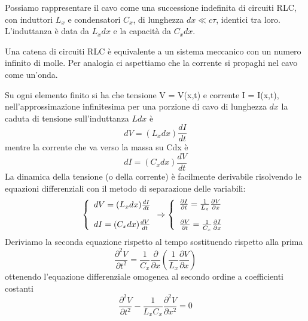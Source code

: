 Possiamo rappresentare il cavo come una successione indefinita di circuiti RLC, con induttori $L_x$ e condensatori $C_x$, di lunghezza $dx \ll c \tau$, identici tra loro. L'induttanza \`e data da $L_x dx$ e la capacit\`a da $C_xdx$.
\newline

Una catena di circuiti RLC \`e equivalente a un sistema meccanico con un numero infinito di molle. Per analogia ci aspettiamo che la corrente si propaghi nel cavo come un'onda.


Su ogni elemento finito si ha che tensione V = V(x,t) e corrente I = I(x,t), nell'approssimazione infinitesima per una porzione di cavo di lunghezza $dx$ la caduta di tensione sull'induttanza $Ldx$ \`e 
\begin{equation*}
	dV = (L_x dx) \frac{dI}{dt}
\end{equation*}
mentre la corrente che va verso la massa su Cdx \`e 
\begin{equation*}
	dI = (C_x dx) \frac{dV}{dt}
\end{equation*}
La dinamica della tensione (o della corrente) \`e facilmente derivabile risolvendo le equazioni differenziali con il metodo di separazione delle variabili:
\begin{equation}
\left\{\begin{array} { l } 
{ d V = ( L _ { x } d x ) \frac { d I } { d t } } \\ \rule{0pt}{20pt}
{ d I = ( C _ { x } d x ) \frac { d V } { d t } }
\end{array} \Rightarrow \left\{\begin{array}{l}
\frac{\partial I}{\partial t}=\frac{1}{L_x} \frac{\partial V}{\partial x} \\ \rule{0pt}{20pt}
\frac{\partial V}{\partial t}=\frac{1}{C_x} \frac{\partial I}{\partial x}
\end{array}\right.\right.
\end{equation}
Deriviamo la seconda equazione rispetto al tempo sostituendo rispetto alla prima 
\begin{equation*}
\frac{\partial^2 V}{\partial t^2}=\frac{1}{C_x} \frac{\partial}{\partial x}\left(\frac{1}{L_x} \frac{\partial V}{\partial x}\right)
\end{equation*}
ottenendo l'equazione differenziale omogenea al secondo ordine a coefficienti costanti
\begin{equation}
\frac{\partial^2 V}{\partial t^2}-\frac{1}{L_x C_x} \frac{\partial^2 V}{\partial x^2}=0
\end{equation}
